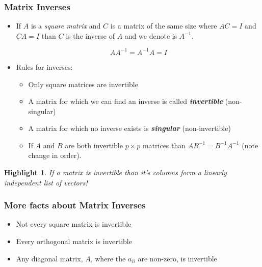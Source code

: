 \documentclass{beamer}
\newcommand{\Inv}[1]{\ensuremath{#1^{-1}}}
\newtheorem{Highlight}{Highlight}
\begin{document}
\begin{frame}
  \frametitle{Matrix Inverses}

\begin{itemize}
\item If $A$ is a \emph{square matrix} and $C$ is a matrix of the same size where $AC = I$ and $CA=I$ than $C$ is the inverse of $A$ and we denote is \Inv{A}.

\[
A\Inv{A} = \Inv{A}A = I
\]


\item Rules for inverses:

\begin{itemize}
 \item Only square matrices are invertible
 \item A matrix for which we can find an inverse is called \emph{\textbf{invertible}} (non-singular)
 \item A matrix for which no inverse exists is \emph{\textbf{singular}} (non-invertible)
 \item If $A$ and $B$ are both invertible $p \times p$ matrices than $\Inv{AB} = \Inv{B} \Inv{A}$ (note change in order).
\end{itemize}
 
\end{itemize}

\begin{Highlight}
  If a matrix is invertible than it's columns form a linearly independent list of vectors!
\end{Highlight}

\end{frame}

\begin{frame}
  \frametitle{More facts about Matrix Inverses}

 \begin{itemize}
 \item Not every square matrix is invertible
 \item Every orthogonal matrix is invertible
 \item Any diagonal matrix, $A$, where the $a_{ii}$ are non-zero, is invertible
 \end{itemize}
 
\end{frame} 
\end{document}
